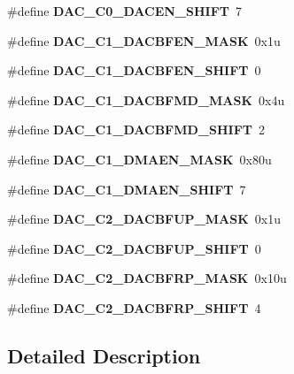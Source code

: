 \begin{DoxyCompactItemize}
\#define {\bfseries D\+A\+C\+\_\+\+C0\+\_\+\+D\+A\+C\+E\+N\+\_\+\+S\+H\+I\+FT}~7
\item 
\mbox{\label{group___d_a_c___register___masks_ga61aa82d21d0c84ff4fe42d0856c506bd}} 
\#define {\bfseries D\+A\+C\+\_\+\+C1\+\_\+\+D\+A\+C\+B\+F\+E\+N\+\_\+\+M\+A\+SK}~0x1u
\item 
\mbox{\label{group___d_a_c___register___masks_ga2062351429a9e737c0ac434488b59fe4}} 
\#define {\bfseries D\+A\+C\+\_\+\+C1\+\_\+\+D\+A\+C\+B\+F\+E\+N\+\_\+\+S\+H\+I\+FT}~0
\item 
\mbox{\label{group___d_a_c___register___masks_ga28373e4d9ae322da4f6a37933a340b78}} 
\#define {\bfseries D\+A\+C\+\_\+\+C1\+\_\+\+D\+A\+C\+B\+F\+M\+D\+\_\+\+M\+A\+SK}~0x4u
\item 
\mbox{\label{group___d_a_c___register___masks_ga779629844ed0967b310e7f2721c54624}} 
\#define {\bfseries D\+A\+C\+\_\+\+C1\+\_\+\+D\+A\+C\+B\+F\+M\+D\+\_\+\+S\+H\+I\+FT}~2
\item 
\mbox{\label{group___d_a_c___register___masks_ga091be41dfd851b71978ab7298c372292}} 
\#define {\bfseries D\+A\+C\+\_\+\+C1\+\_\+\+D\+M\+A\+E\+N\+\_\+\+M\+A\+SK}~0x80u
\item 
\mbox{\label{group___d_a_c___register___masks_ga481f558223c5c36402bebe924bdd00a3}} 
\#define {\bfseries D\+A\+C\+\_\+\+C1\+\_\+\+D\+M\+A\+E\+N\+\_\+\+S\+H\+I\+FT}~7
\item 
\mbox{\label{group___d_a_c___register___masks_ga329015367026aaee34f54edcbaab61bb}} 
\#define {\bfseries D\+A\+C\+\_\+\+C2\+\_\+\+D\+A\+C\+B\+F\+U\+P\+\_\+\+M\+A\+SK}~0x1u
\item 
\mbox{\label{group___d_a_c___register___masks_ga5d43a79719748e490a572fa6cdc75efe}} 
\#define {\bfseries D\+A\+C\+\_\+\+C2\+\_\+\+D\+A\+C\+B\+F\+U\+P\+\_\+\+S\+H\+I\+FT}~0
\item 
\mbox{\label{group___d_a_c___register___masks_ga64b53e5effabf2e736fca6088752e6ea}} 
\#define {\bfseries D\+A\+C\+\_\+\+C2\+\_\+\+D\+A\+C\+B\+F\+R\+P\+\_\+\+M\+A\+SK}~0x10u
\item 
\mbox{\label{group___d_a_c___register___masks_ga0ab880f693c25ecf491d3b76df611456}} 
\#define {\bfseries D\+A\+C\+\_\+\+C2\+\_\+\+D\+A\+C\+B\+F\+R\+P\+\_\+\+S\+H\+I\+FT}~4
\end{DoxyCompactItemize}


\subsection{Detailed Description}

